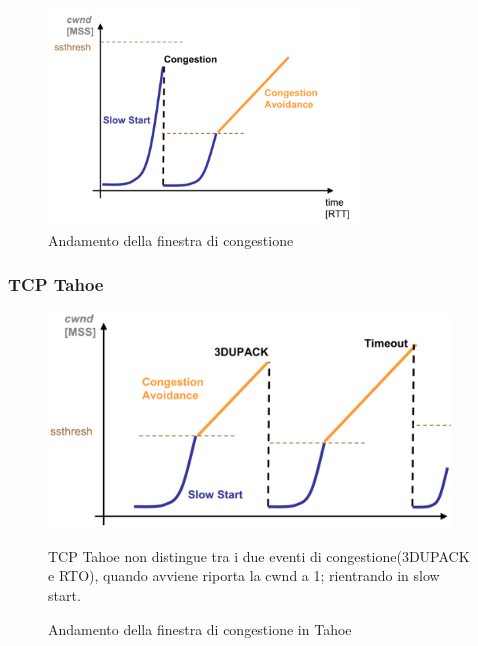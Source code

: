   
        \begin{figure}[h!]
        \centering
        \includegraphics[width=0.75\textwidth]{images/graficocongestione.png}
        \caption{Andamento della finestra di congestione}
        \label{fig:graficocongestione}
        \end{figure}

        \newpage

\subsubsection{TCP Tahoe}

\begin{figure}[h!]
    \begin{minipage}{0.6\textwidth}
        \centering
        \includegraphics[width=0.95\textwidth]{images/tahoe.png}
        \caption{Andamento della finestra di congestione in Tahoe}
        \label{fig:tcptahoe}
    \end{minipage}
    \hfill
    \begin{minipage}{0.48\textwidth}
        TCP Tahoe non distingue tra i due eventi di congestione(3DUPACK e RTO), quando avviene riporta la cwnd a 1; rientrando in slow start.
    \end{minipage}
\end{figure}

